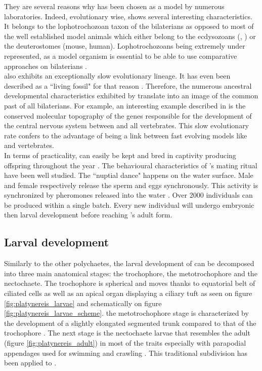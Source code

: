      They are several reasons why \platy{} has been chosen as a model by numerous laboratories. Indeed, evolutionary wise, \platy{} shows several interesting characteristics. It belongs to the lophotrochozoan taxon of the bilaterians as opposed to most of the well established model animals which either belong to the ecdysozoans (, ) or the deuterostomes (mouse, human). Lophotrochozoans being extremely under represented, \platy{} as a model organism is essential to be able to use comparative approaches on bilaterians \cite{Fischer10}.\\
     
     \platy{} also exhibits an exceptionally slow evolutionary lineage. It has even been described as a ``living fossil" for that reason \cite{Fischer10}. Therefore, the numerous ancestral developmental characteristics exhibited by \platy{} translate into an image of the common past of all bilaterians. For example, an interesting example described in \cite{denes07,tessmar07} is the conserved molecular topography of the genes responsible for the development of the central nervous system between \platy{} and all vertebrates. This slow evolutionary rate confers to \platy{} the advantage of being a link between fast evolving models like  and vertebrates.\\
     
     In terms of practicality, \platy{} can easily be kept and bred in captivity producing offspring throughout the year \cite{fischer04}. The behavioural characteristics of \platy{}'s mating ritual have been well studied. The ``nuptial dance" happens on the water surface. Male and female respectively release the sperm and eggs synchronously. This activity is synchronized by pheromones released into the water \cite{zeeck98}. Over 2000 individuals can be produced within a single batch. Every new individual will undergo embryonic then larval development before reaching \platy{}'s adult form.\\

 
     \subsection{Larval development}
    Similarly to the other polychaetes, the larval development of \platy{} can be decomposed into three main anatomical stages: the trochophore, the metotrochophore and the nectochaete. The trochophore is spherical and moves thanks to equatorial belt of ciliated cells as well as an apical organ displaying a ciliary tuft \cite{rouse99,nielsen04} as seen on figure \ref{fig:platynereis_larvae} and schematically on figure \ref{fig:platynereis_larvae_scheme}. the metotrochophore stage is characterized by the development of a slightly elongated segmented trunk compared to that of the trochophore \cite{hacker98}. The next stage is the nectochaete larvae that resembles the adult (figure \ref{fig:platynereis_adult}) in most of the traits especially with parapodial appendages used for swimming and crawling \cite{hacker98}. This traditional subdivision has been applied to \platy{} \cite{hauenschild69}.\\
    

